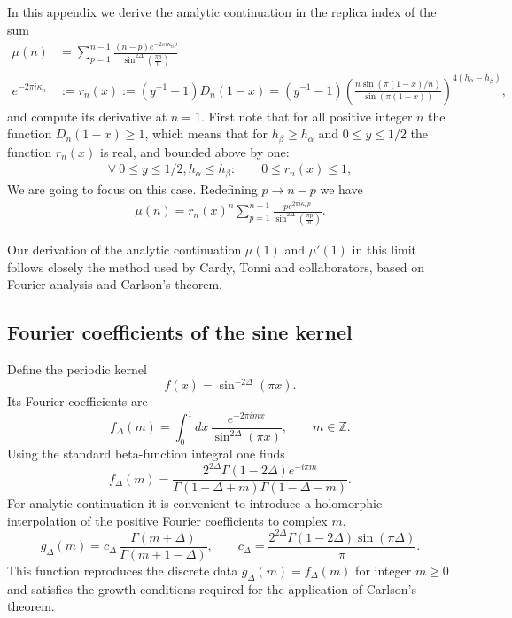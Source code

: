 \documentclass[11pt]{article}
\newcommand{\nn}{\nonumber}
\newcommand{\lb}{\left(}
\newcommand{\rb}{\right)}
\begin{document}
In this appendix we derive the analytic continuation in the replica index
of the sum
\begin{align}
\mu(n)&=\sum_{p=1}^{n-1}\frac{(n-p)e^{-2\pi i \kappa_n p}}{\sin^{2\Delta}\!\left(\frac{\pi p}{n}\right)}\nn\\
e^{-2\pi i \kappa_n}&:=r_n(x):=(y^{-1}-1)D_n(1-x)=(y^{-1}-1)\lb\frac{n\sin(\pi (1-x)/n)}{\sin(\pi (1-x))} \rb^{4(h_\alpha-h_\beta)},
\end{align}
and compute its derivative at $n=1$. First note that for all positive integer $n$ the function $D_n(1-x)\geq 1$, which means that for $h_\beta\geq h_\alpha$ and $0\leq y\leq 1/2$ the function $r_n(x)$ is real, and bounded above by one:
\begin{align}
  \forall\: 0\leq y\leq 1/2, h_\alpha\leq h_\beta: \qquad 0\leq r_n(x)\leq 1,   
\end{align}
We are going to focus on this case. Redefining $p\to n-p$ we have
\begin{align}
\mu(n)=r_n(x)^{n}\sum_{p=1}^{n-1}\frac{p e^{2\pi i \kappa_n p}}{\sin^{2\Delta}\left(\frac{\pi p}{n}\right)}.
\end{align}


Our derivation of the analytic continuation $\mu(1)$ and $\mu'(1)$ in this limit follows closely the
method used by Cardy, Tonni and collaborators, based on Fourier analysis
and Carlson's theorem.

\subsection{Fourier coefficients of the sine kernel}

Define the periodic kernel
\begin{equation}
f(x)=\sin^{-2\Delta}(\pi x).
\end{equation}
Its Fourier coefficients are
\begin{equation}
f_\Delta(m)=\int_0^1 dx\,\frac{e^{-2\pi i m x}}{\sin^{2\Delta}(\pi x)},
\qquad m\in\mathbb Z .
\end{equation}
Using the standard beta-function integral one finds
\begin{equation}
f_\Delta(m)=
\frac{2^{2\Delta}\Gamma(1-2\Delta)e^{-i\pi m}}
{\Gamma(1-\Delta+m)\Gamma(1-\Delta-m)} .
\end{equation}
For analytic continuation it is convenient to introduce a holomorphic
interpolation of the positive Fourier coefficients to complex $m$,
\begin{equation}\label{eq: Fourier coeff of csc^2Delta}
g_\Delta(m)=c_\Delta\,\frac{\Gamma(m+\Delta)}{\Gamma(m+1-\Delta)},
\qquad
c_\Delta=\frac{2^{2\Delta}\Gamma(1-2\Delta)\sin(\pi\Delta)}{\pi}.
\end{equation}
This function reproduces the discrete data
\(
g_\Delta(m)=f_\Delta(m)
\)
for integer $m\ge0$ and satisfies the growth conditions required for the
application of Carlson's theorem.
\end{document}
